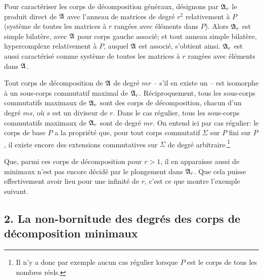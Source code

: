 Pour caractériser les corps de décomposition généraux, désignons par $\mathfrak A_r$ le produit direct de $\mathfrak A$ avec l'anneau de matrices de degré $r^2$ relativement à $P$ (système de toutes les matrices à $r$ rangées avec éléments dans $P$). Alors $\mathfrak A_r$ est simple bilatère, avec $\mathfrak A$ pour corps gauche associé; et tout anneau simple bilatère, hypercomplexe relativement à $P$, auquel $\mathfrak A$ est associé, s'obtient ainsi. $\mathfrak A_r$ est aussi caractérisé comme système de toutes les matrices à $r$ rangées avec éléments dans $\mathfrak A$.

Tout corps de décomposition de $\mathfrak A$ de degré $mr$ -- s'il en existe un -- est isomorphe à un sous-corps commutatif maximal de $\mathfrak A_r$. Réciproquement, tous les sous-corps commutatifs maximaux de $\mathfrak A_r$ sont des corps de décomposition, chacun d'un degré $ms$, où $s$ est un diviseur de $r$. Dans le cas régulier, tous les sous-corps commutatifs maximaux de $\mathfrak A_r$ sont de degré $mr$. On entend ici par cas régulier: le corps de base $P$ a la propriété que, pour tout corps commutatif $\Sigma$ sur $P$ fini sur $P$, il existe encore des extensions commutatives sur $\Sigma$ de degré arbitraire.\footnote{Il n'y a donc par exemple aucun cas régulier lorsque $P$ est le corps de tous les nombres réels.}

Que, parmi ces corps de décomposition pour $r>1$, il en apparaisse aussi de minimaux n'est pas encore décidé par le plongement dans $\mathfrak A_r$. Que cela puisse effectivement avoir lieu pour une infinité de $r$, c'est ce que montre l'exemple suivant.

\subsection*{2. La non-bornitude des degrés des corps de décomposition minimaux}

